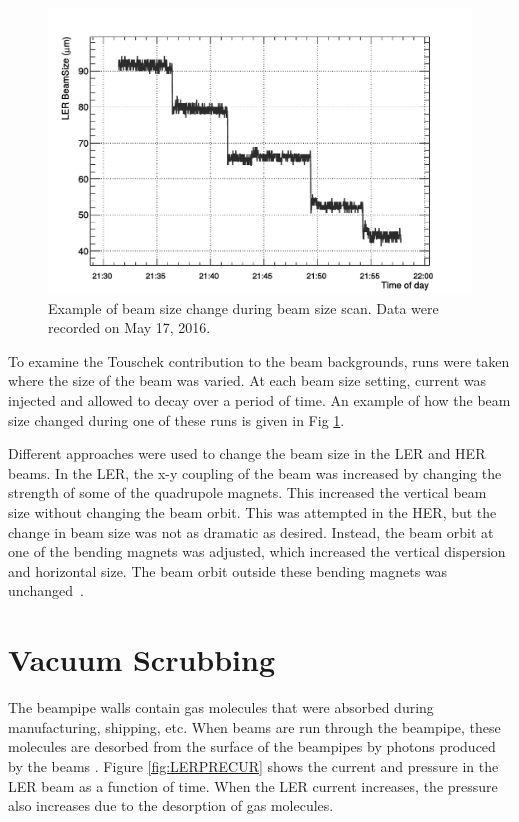 \begin{figure}[htb]
	\centerfloat
		\includegraphics[trim={0 0 0 0.75cm},clip, width=\textwidth]{images/BeamSizeScan}
	\caption[Example of beam size change during beam size scan]{Example of beam size change during beam size scan. Data were recorded on May 17, 2016.}	
	\label{fig:BeamSizeEg}
\end{figure}


	To examine the Touschek contribution to the beam backgrounds, runs were taken where the size of the beam was varied. At each beam size setting, current was injected and allowed to decay over a period of time. An example of how the beam size changed during one of these runs is given in Fig \ref{fig:BeamSizeEg}.

	
	Different approaches were used to change the beam size in the LER and HER beams. In the LER, the x-y coupling of the beam was increased by changing the strength of some of the quadrupole magnets. This increased the vertical beam size without changing the beam orbit. This was attempted in the HER, but the change in beam size was not as dramatic as desired. Instead, the beam orbit at one of the bending magnets was adjusted, which increased the vertical dispersion and horizontal size. The beam orbit outside these bending magnets was unchanged~\cite{Hiro}.





\section{Vacuum Scrubbing}


	The beampipe walls contain gas molecules that were absorbed during manufacturing, shipping, etc. When beams are run through the beampipe, these molecules are desorbed from the surface of the beampipes by photons produced by the beams \cite{chao2013handbook}. Figure \ref{fig:LERPRECUR} shows the current and pressure in the LER beam as a function of time. When the LER current increases, the pressure also increases due to the desorption of gas molecules.

